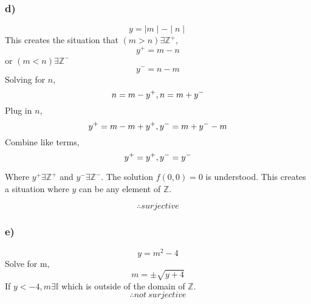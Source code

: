 \documentclass[journal]{IEEEtran}
\begin{document}
    \subsubsection*{d)}
        \begin{equation}
            y = \mid m \mid - \mid n \mid
        \end{equation}
        This creates the situation that $(m > n) \exists \mathbb{Z}^+$,
        \begin{equation}
            y^+ = m - n
        \end{equation}
        or $(m < n) \exists \mathbb{Z}^-$
        \begin{equation}
            y^- = n - m
        \end{equation}
        Solving for $n$,
        \begin{equation}
            n = m-y^+,~ \\
            n = m+y^-
        \end{equation}
        Plug in $n$,
        \begin{equation}
            y^+ = m - m + y^+,~ \\
            y^- = m + y^- - m
        \end{equation}
        Combine like terms,
        \begin{equation}
            y^+ = y^+,~ \\
            y^- = y^-
        \end{equation}

        Where $y^+ \exists \mathbb{Z}^+$ and $y^- \exists \mathbb{Z}^-$. The solution $f(0,0) = 0$ is understood.
        This creates a situation where $y$ can be any element of $\mathbb{Z}$. 

        \begin{equation}
            \boxed{\therefore surjective}
        \end{equation}

    \subsubsection*{e)}
        \begin{equation}
            y = m^2 - 4
        \end{equation}
        Solve for m,
        \begin{equation}
            m = \pm \sqrt{y+4}
        \end{equation}
        If $y < -4, m\exists \mathbb{I}$ which is outside of the domain of $\mathbb{Z}$.
        \begin{equation}
            \boxed{\therefore not~surjective}
        \end{equation}
\end{document}
